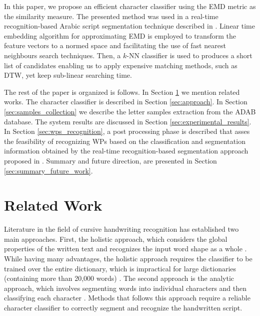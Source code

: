 \documentclass[10pt, conference, compsocconf]{IEEEtran}
\begin{document}
In this paper, we propose an efficient character classifier using the EMD metric as the similarity measure. 
The presented method was used in a real-time recognition-based Arabic script segmentation technique described in \cite{kour2014real}.
Linear time embedding algorithm for approximating EMD \cite{shirdhonkar2008approximate} is employed to transform the feature vectors to a normed space and facilitating the use of fast nearest neighbours search techniques.
Then, a $k$-NN classifier is used to produces a short list of candidates enabling us to apply expensive matching methods, such as DTW, yet keep sub-linear searching time.

The rest of the paper is organized is follows. 
In Section \ref{sec:related_work} we mention related works. 
The character classifier is described in Section \ref{sec:approach}. 
In Section \ref{sec:samples_collection} we describe the letter samples extraction from the ADAB database.
The system results are discussed in Section \ref{sec:experimental_results}.
In Section \ref{sec:wps_recognition}, a post processing phase is described that asses the feasibility of recognizing WPs based on the classification and segmentation information obtained by the real-time recognition-based segmentation approach proposed in \cite{kour2014real}. 
Summary and future direction, are presented in Section \ref{sec:summary_future_work}. 

\section{Related Work}
\label{sec:related_work}
Literature in the field of cursive handwriting recognition has established two main approaches. 
First, the holistic approach, which considers the global properties of the written text and recognizes the input word shape as a whole \cite{biadsy2011segmentation, saabni2009hierarchical}. 
While having many advantages, the holistic approach requires the classifier to be trained over the entire dictionary, which is impractical for large dictionaries (containing more than 20,000 words) \cite{elanwar2012unconstrained}.
The second approach is the analytic approach, which involves segmenting words into individual characters and then classifying each character \cite{abdulla2008off, sari2002off, Dinges2011}. 
Methods that follows this approach require a reliable character classifier to correctly segment and recognize the handwritten script.
\end{document}
